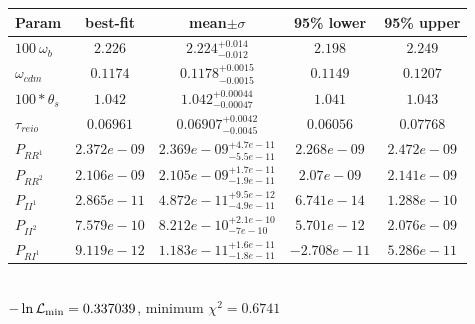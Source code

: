 \begin{tabular}{|l|c|c|c|c|} 
 \hline 
Param & best-fit & mean$\pm\sigma$ & 95\% lower & 95\% upper \\ \hline 
$100~\omega_{b }$ &$2.226$ & $2.224_{-0.012}^{+0.014}$ & $2.198$ & $2.249$ \\ 
$\omega_{cdm }$ &$0.1174$ & $0.1178_{-0.0015}^{+0.0015}$ & $0.1149$ & $0.1207$ \\ 
$100*\theta_{s }$ &$1.042$ & $1.042_{-0.00047}^{+0.00044}$ & $1.041$ & $1.043$ \\ 
$\tau_{reio }$ &$0.06961$ & $0.06907_{-0.0045}^{+0.0042}$ & $0.06056$ & $0.07768$ \\ 
$P_{{RR}^1 }$ &$2.372e-09$ & $2.369e-09_{-5.5e-11}^{+4.7e-11}$ & $2.268e-09$ & $2.472e-09$ \\ 
$P_{{RR}^2 }$ &$2.106e-09$ & $2.105e-09_{-1.9e-11}^{+1.7e-11}$ & $2.07e-09$ & $2.141e-09$ \\ 
$P_{{II}^1 }$ &$2.865e-11$ & $4.872e-11_{-4.9e-11}^{+9.5e-12}$ & $6.741e-14$ & $1.288e-10$ \\ 
$P_{{II}^2 }$ &$7.579e-10$ & $8.212e-10_{-7e-10}^{+2.1e-10}$ & $5.701e-12$ & $2.076e-09$ \\ 
$P_{{RI}^1 }$ &$9.119e-12$ & $1.183e-11_{-1.8e-11}^{+1.6e-11}$ & $-2.708e-11$ & $5.286e-11$ \\ 
\hline 
 \end{tabular} \\ 
$-\ln{\cal L}_\mathrm{min} =0.337039$, minimum $\chi^2=0.6741$ \\ 
